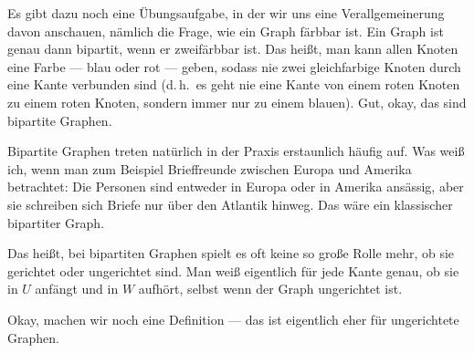 \begin{spoken-clean}[00:59:56 - 01:01:08]
Es gibt dazu noch eine Übungsaufgabe, in der wir uns eine Verallgemeinerung davon anschauen, nämlich die Frage, wie ein Graph färbbar ist. Ein Graph ist genau dann bipartit, wenn er zweifärbbar ist. Das heißt, man kann allen Knoten eine Farbe --- blau oder rot --- geben, sodass nie zwei gleichfarbige Knoten durch eine Kante verbunden sind (d.\,h.\ es geht nie eine Kante von einem roten Knoten zu einem roten Knoten, sondern immer nur zu einem blauen). Gut, okay, das sind bipartite Graphen.

Bipartite Graphen treten natürlich in der Praxis erstaunlich häufig auf. Was weiß ich, wenn man zum Beispiel Brieffreunde zwischen Europa und Amerika betrachtet: Die Personen sind entweder in Europa oder in Amerika ansässig, aber sie schreiben sich Briefe nur über den Atlantik hinweg. Das wäre ein klassischer bipartiter Graph.
\end{spoken-clean}

\begin{math-stroke}
\end{math-stroke}

\begin{spoken-clean}[01:01:08 - 01:02:13]
Das heißt, bei bipartiten Graphen spielt es oft keine so große Rolle mehr, ob sie gerichtet oder ungerichtet sind. Man weiß eigentlich für jede Kante genau, ob sie in $U$ anfängt und in $W$ aufhört, selbst wenn der Graph ungerichtet ist.

Okay, machen wir noch eine Definition --- das ist eigentlich eher für ungerichtete Graphen.
\end{spoken-clean}


